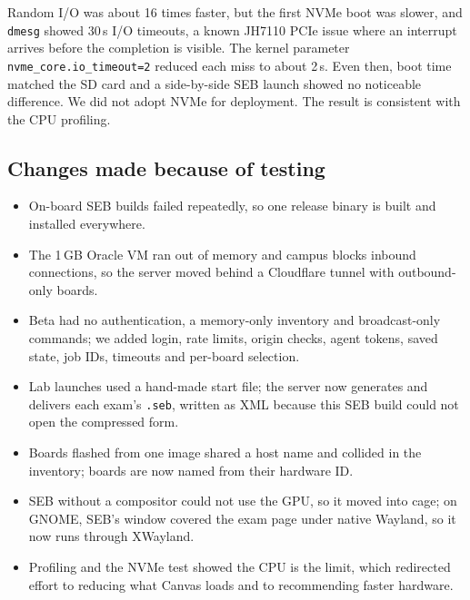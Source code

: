 \documentclass[11pt]{article}
\begin{document}
Random I/O was about 16 times faster, but the first NVMe boot was slower, and \texttt{dmesg} showed 30\,s I/O timeouts, a known JH7110 PCIe issue where an interrupt arrives before the completion is visible. The kernel parameter \texttt{nvme\_core.io\_timeout=2} reduced each miss to about 2\,s. Even then, boot time matched the SD card and a side-by-side SEB launch showed no noticeable difference. We did not adopt NVMe for deployment. The result is consistent with the CPU profiling.

\subsection{Changes made because of testing}
\begin{itemize}
  \item On-board SEB builds failed repeatedly, so one release binary is built and installed everywhere.
  \item The 1\,GB Oracle VM ran out of memory and campus blocks inbound connections, so the server moved behind a Cloudflare tunnel with outbound-only boards.
  \item Beta had no authentication, a memory-only inventory and broadcast-only commands; we added login, rate limits, origin checks, agent tokens, saved state, job IDs, timeouts and per-board selection.
  \item Lab launches used a hand-made start file; the server now generates and delivers each exam's \texttt{.seb}, written as XML because this SEB build could not open the compressed form.
  \item Boards flashed from one image shared a host name and collided in the inventory; boards are now named from their hardware ID.
  \item SEB without a compositor could not use the GPU, so it moved into cage; on GNOME, SEB's window covered the exam page under native Wayland, so it now runs through XWayland.
  \item Profiling and the NVMe test showed the CPU is the limit, which redirected effort to reducing what Canvas loads and to recommending faster hardware.
\end{itemize}
\end{document}
